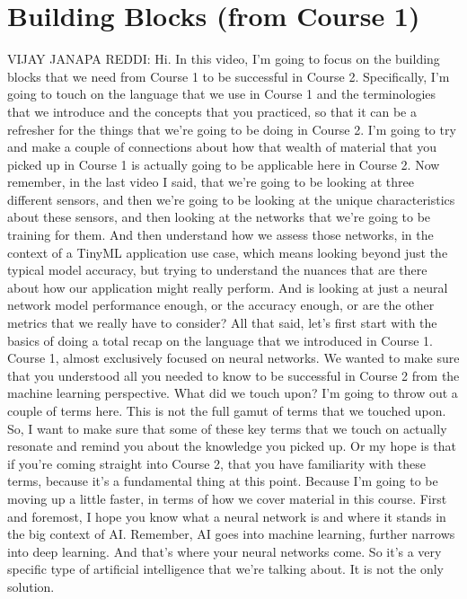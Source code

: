 \section{Building Blocks (from Course 1)}

VIJAY JANAPA REDDI: Hi.
In this video, I'm going to focus on the building blocks
that we need from Course 1 to be successful in Course 2.
Specifically, I'm going to touch on the language that we
use in Course 1 and the terminologies that we introduce
and the concepts that you practiced, so that it
can be a refresher for the things that we're going to be doing in Course 2.
I'm going to try and make a couple of connections
about how that wealth of material that you picked up in Course 1
is actually going to be applicable here in Course 2.
Now remember, in the last video I said, that we're
going to be looking at three different sensors,
and then we're going to be looking at the unique characteristics
about these sensors, and then looking at the networks
that we're going to be training for them.
And then understand how we assess those networks,
in the context of a TinyML application use
case, which means looking beyond just the typical model accuracy,
but trying to understand the nuances that are there about how
our application might really perform.
And is looking at just a neural network model performance enough,
or the accuracy enough, or are the other metrics
that we really have to consider?
All that said, let's first start with the basics
of doing a total recap on the language that we introduced in Course 1.
Course 1, almost exclusively focused on neural networks.
We wanted to make sure that you understood
all you needed to know to be successful in Course 2
from the machine learning perspective.
What did we touch upon?
I'm going to throw out a couple of terms here.
This is not the full gamut of terms that we touched upon.
So, I want to make sure that some of these key terms that we
touch on actually resonate and remind you about the knowledge you picked up.
Or my hope is that if you're coming straight into Course 2,
that you have familiarity with these terms,
because it's a fundamental thing at this point.
Because I'm going to be moving up a little faster, in terms of how
we cover material in this course.
First and foremost, I hope you know what a neural network is
and where it stands in the big context of AI.
Remember, AI goes into machine learning, further narrows into deep learning.
And that's where your neural networks come.
So it's a very specific type of artificial intelligence
that we're talking about.
It is not the only solution.
